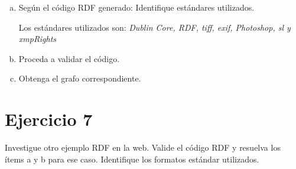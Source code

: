 \documentclass[a4paper,12pt,twoside,final,spanish]{article}
\begin{document}
\begin{enumerate}[a.]
\begin{lstlisting}
<rdf:Description rdf:about="https://esp.rt.com/actualidad/public_images/2017.01/article/588cfecfc46188b90c8b4621.jpg">
	<dc:title>aguila</dc:title>
	<dc:description>un aguila en un fondo borroso</dc:description>
	<dc:subject>
		<rdf:Bag>
			<rdf:li>aguila</rdf:li>
			<rdf:li>gauss</rdf:li>
			<rdf:li>pico</rdf:li>
			<rdf:li>blanco</rdf:li>
			<rdf:li>mirada</rdf:li>
		</rdf:Bag>
	</dc:subject>
	<dc:language>es</dc:language>
	<dc:date>2017-04-04</dc:date>
	<tiff:Artist>Dari&#233;n</tiff:Artist>
	<dc:creator>Dari&#233;n</dc:creator>
	<dc:publisher>seyfer studios</dc:publisher>
	<dc:type>image</dc:type>
	<dc:format>image/jpeg</dc:format>
	<exif:SceneCaptureType>3</exif:SceneCaptureType>
	<photoshop:Country>argentina</photoshop:Country>
	<photoshop:State>santa fe</photoshop:State>
	<photoshop:City>santa fe</photoshop:City>
	<s1:camara>nikon D3200</s1:camara>
	<s1:lens>18-55mm</s1:lens>
	<tiff:Software>adobe lightroom</tiff:Software>
	<xmpRights:Owner>darien</xmpRights:Owner>
	<dc:Rights>http://creativecommons.org/licenses/by/2.0/deed.es</dc:Rights>
	<link>https://esp.rt.com/actualidad/public_images/2017.01/article/588cfecfc46188b90c8b4621.jpg</link>
	<dc:identifier>https://esp.rt.com/actualidad/public_images/2017.01/article/588cfecfc46188b90c8b4621.jpg</dc:identifier>
	<admin:generatorAgent rdf:resource="http://www.webposible.com/utilidades/generador_rdf_foto.html"/>
</rdf:Description>
</rdf:RDF>
\end{lstlisting}

\item Según el código RDF generado: Identifique estándares utilizados.

\dotfill

Los estándares utilizados son: \textit{Dublin Core, RDF, tiff, exif, Photoshop, sl y xmpRights}

\item Proceda a validar el código.

\dotfill

\item Obtenga el grafo correspondiente. 

\dotfill

\end{enumerate}

\section*{Ejercicio 7}

Investigue otro ejemplo RDF en la web. Valide el código RDF y resuelva los ítems a y b para ese caso. Identifique los formatos estándar utilizados.
\end{document}
